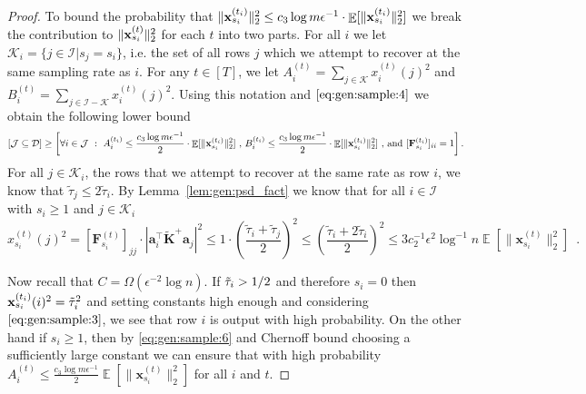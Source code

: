 \documentclass[11pt]{article}
\DeclareMathOperator*{\E}{\mathbb{E}}
\let\Pr\relax
\DeclareMathOperator*{\Pr}{\mathbb{P}}
\newcommand{\norm}[1]{\|#1\|}
\newcommand{\bv}[1]{\mathbf{#1}}
\newcommand{\mvar}[1]{\bv{#1}}
\newcommand{\mk}{\mvar{K}}
\newcommand{\dist}{\mathcal{D}}
\begin{document}
\begin{proof}
To bound the probability that $\norm{\vxsiti}_2^2 \leq c_3 \log m \epsilon^{-1}  \cdot \E[\norm{\vxsiti}_2^2]$ we break the contribution to $\norm{\vxsit}_2^2$ for each $t$ into two parts. For all $i$ we let $\mathcal{K}_i = \{j \in \mathcal{I} | s_j = s_i\}$, i.e. the set of all rows $j$ which we attempt to recover at the same sampling rate as $i$. For any $t \in [T]$, we let $A_i^{(t)} = \sum_{j \in \mathcal{K}} x_i^{(t)}(j)^2$ and  $B_i^{(t)} = \sum_{j \in \mathcal{I} - \mathcal{K}} x_i^{(t)}(j)^2$. Using this notation and $\eqref{eq:gen:sample:4}$ we obtain the following lower bound
\[
\Pr[\mathcal{J} \subseteq \dist]
\geq \Pr\left[\forall i \in \mathcal{J} ~ : ~
A_i^{(t_i)} \leq \frac{c_3 \log m \epsilon^{-1}}{2} \cdot \E[\norm{\vxsiti}_2^2] ~ \text{,} ~
B_i^{(t_i)} \leq \frac{c_3 \log m \epsilon^{-1}}{2} \cdot \E[\norm{\vxsiti}_2^2] ~ \text{,} ~
\text{and} ~
[\bv{F}_{s_i}^{(t_i)}]_{ii} = 1
\right].
\]
For all $j \in \mathcal{K}_i$, the rows that we attempt to recover at the same rate as row $i$, we know that $\tilde{\tau}_j \leq 2 \tilde{\tau}_i$. By Lemma~\ref{lem:gen:psd_fact} we know that for all $i \in \mathcal{I}$ with $s_i \geq 1$ and $j \in \mathcal{K}_i$
\begin{equation}
\label{eq:gen:sample:6}
x_{s_i}^{(t)}(j)^2
= [\bv{F}_{s_i}^{(t)}]_{jj} \cdot \left| \bv{a}_i^\top \tilde{\mk}^+ \bv{a}_j \right|^2
\leq 1 \cdot \left(\frac{\tilde{\tau}_i + \tilde{\tau}_j}{2}\right)^2
\leq \left(\frac{\tilde{\tau}_i + 2 \tilde{\tau}_i}{2}\right)^2
\leq 3c_2^{-1}\epsilon^2 \log^{-1} n  \E[\norm{\bv{x}_{s_i}^{(t)}}_2^2]
\enspace.
\end{equation}

Now recall that $C = \Omega(\epsilon^{-2} \log n)$. If $\tilde{\tau}_i > 1/2$ and therefore $s_i = 0$ then $\xsiti(i)^2 = \strlev_i^2$ and setting constants high enough and considering $\eqref{eq:gen:sample:3}$, we see that row $i$ is output with high probability. On the other hand if $s_i \geq 1$, then by \eqref{eq:gen:sample:6} and Chernoff bound choosing a sufficiently large constant we can ensure that with high probability $A_i^{(t)} \leq \frac{c_3 \log m \epsilon^{-1}}{2} \E[\norm{\bv{x}_{s_i}^{(t)}}_2^2]$ for all $i$ and $t$. 


\end{proof}
\end{document}
